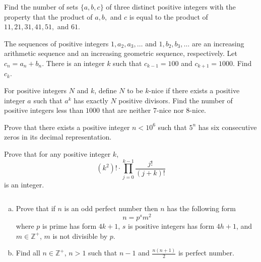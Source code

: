 \documentclass[problems.tex]{subfile}
\begin{document}
	\begin{problem}
		Find the number of sets $\{a,b,c\}$ of three distinct positive integers with the property that the product of $a,b,$ and $c$ is equal to the product of $11,21,31,41,51,$ and $61$. %
	\end{problem}

	\begin{problem}
		The sequences of positive integers $1,a_2,a_3,\ldots$ and $1,b_2,b_3,\ldots$ are an increasing arithmetic sequence and an increasing geometric sequence, respectively. Let $c_n=a_n+b_n$. There is an integer $k$ such that $c_{k-1}=100$ and $c_{k+1}=1000$. Find $c_k$. %
	\end{problem}

	\begin{problem}
		For positive integers $N$ and $k$, define $N$ to be $k$-nice if there exists a positive integer $a$ such that $a^k$ has exactly $N$ positive divisors. Find the number of positive integers less than $1000$ that are neither $7$-nice nor $8$-nice. %
	\end{problem}

	\begin{problem}[USAJMO 2016]
		Prove that there exists a positive integer $n < 10^6$ such that $5^n$ has six consecutive zeros in its decimal representation. %
	\end{problem}

	\begin{problem}[USAMO 2016]
		Prove that for any positive integer $k$, \[(k^2)!\cdot\displaystyle\prod_{j=0}^{k-1}\frac{j!}{(j+k)!}\]is an integer. %
	\end{problem}

	\begin{problem}[USAMO 2016]
		$ $
		\begin{enumerate}[(a)]
			\item Prove that if $n$ is an odd perfect number then $n$ has the following form \[ n=p^sm^2 \]where $p$ is prime has form $4k+1$, $s$ is positive integers has form $4h+1$, and $m\in\mathbb{Z}^+$, $m$ is not divisible by $p$.
			\item Find all $n\in\mathbb{Z}^+$, $n>1$ such that $n-1$ and $\frac{n(n+1)}{2}$ is perfect number.
		\end{enumerate}
	\end{problem}
\end{document}
